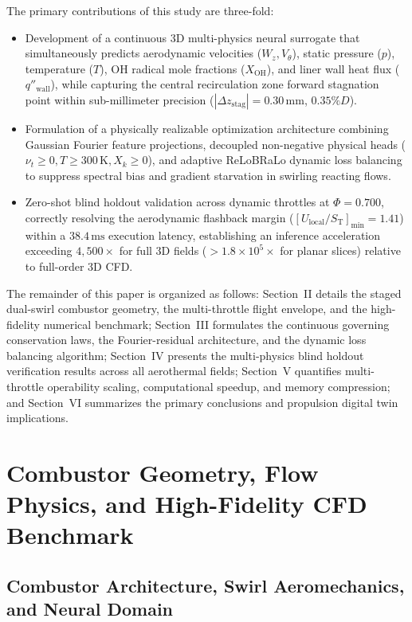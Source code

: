 \documentclass[reprint,aps,prfluids,superscriptaddress,twocolumn,floatfix]{revtex4-2}
\begin{document}
The primary contributions of this study are three-fold:
\begin{itemize}
    \item Development of a continuous 3D multi-physics neural surrogate that simultaneously predicts aerodynamic velocities ($W_z, V_\theta$), static pressure ($p$), temperature ($T$), $\text{OH}$ radical mole fractions ($X_{\text{OH}}$), and liner wall heat flux ($q''_{\text{wall}}$), while capturing the central recirculation zone forward stagnation point within sub-millimeter precision ($|\Delta z_{\text{stag}}| = 0.30\,\text{mm}$, $0.35\% D$).
    \item Formulation of a physically realizable optimization architecture combining Gaussian Fourier feature projections, decoupled non-negative physical heads ($\nu_t \ge 0, T \ge 300\,\text{K}, X_k \ge 0$), and adaptive ReLoBRaLo dynamic loss balancing to suppress spectral bias and gradient starvation in swirling reacting flows.
    \item Zero-shot blind holdout validation across dynamic throttles at $\Phi = 0.700$, correctly resolving the aerodynamic flashback margin ($[U_{\text{local}}/S_{\text{T}}]_{\text{min}} = 1.41$) within a $38.4\,\text{ms}$ execution latency, establishing an inference acceleration exceeding $4,500\times$ for full 3D fields ($> 1.8 \times 10^5\times$ for planar slices) relative to full-order 3D CFD.
\end{itemize}

The remainder of this paper is organized as follows: Section~II details the staged dual-swirl combustor geometry, the multi-throttle flight envelope, and the high-fidelity numerical benchmark; Section~III formulates the continuous governing conservation laws, the Fourier-residual architecture, and the dynamic loss balancing algorithm; Section~IV presents the multi-physics blind holdout verification results across all aerothermal fields; Section~V quantifies multi-throttle operability scaling, computational speedup, and memory compression; and Section~VI summarizes the primary conclusions and propulsion digital twin implications.

\section{Combustor Geometry, Flow Physics, and High-Fidelity CFD Benchmark}
\label{sec:combustor_geometry_cfd}

\subsection{Combustor Architecture, Swirl Aeromechanics, and Neural Domain}
\label{subsec:combustor_architecture}
\end{document}
